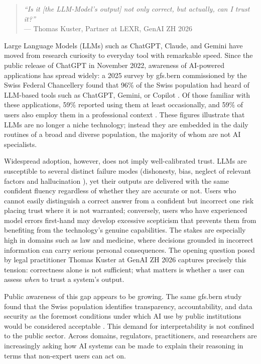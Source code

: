  
\begin{quote}
\textit{``Is it [the LLM-Model's output] not only correct, but actually, can I trust it?''}\\
\hspace*{\fill}--- Thomas Kuster, Partner at LEXR, GenAI ZH 2026
\end{quote}
 
\noindent Large Language Models (LLMs) such as ChatGPT, Claude, and Gemini have moved from
research curiosity to everyday tool with remarkable speed.
Since the public release of ChatGPT in November 2022, awareness of AI-powered
applications has spread widely: a 2025 survey by gfs.bern commissioned by the Swiss
Federal Chancellery found that 96\% of the Swiss population had heard of
LLM-based tools such as ChatGPT, Gemini, or Copilot \cite{bern_chance_2025}.
Of those familiar with these applications, 59\% reported using them at least
occasionally, and 59\% of users also employ them in a professional context
\cite{bern_chance_2025}.
These figures illustrate that LLMs are no longer a niche technology; instead they are embedded
in the daily routines of a broad and diverse population, the majority of whom are not
AI specialists.
 
Widespread adoption, however, does not imply well-calibrated trust.
LLMs are susceptible to several distinct failure modes (dishonesty, bias, neglect of relevant factors and hallucination \cite{wu_usable_2025}), yet their outputs are delivered
with the same confident fluency regardless of whether they are accurate or not.
Users who cannot easily distinguish a correct answer from a confident but incorrect one
risk placing trust where it is not warranted; conversely, users who have experienced
model errors first-hand may develop excessive scepticism that prevents them from
benefiting from the technology's genuine capabilities.
The stakes are especially high in domains such as law and medicine, where decisions
grounded in incorrect information can carry serious personal consequences.
The opening question posed by legal practitioner Thomas Kuster at GenAI ZH 2026
captures precisely this tension: correctness alone is not sufficient; what matters is
whether a user can assess \emph{when} to trust a system's output.
 
Public awareness of this gap appears to be growing.
The same gfs.bern study found that the Swiss population identifies transparency,
accountability, and data security as the foremost conditions under which AI use
by public institutions would be considered acceptable \cite{bern_chance_2025}.
This demand for interpretability is not confined to the public sector.
Across domains, regulators, practitioners, and researchers are increasingly asking
how AI systems can be made to explain their reasoning in terms that non-expert users
can act on.
 
